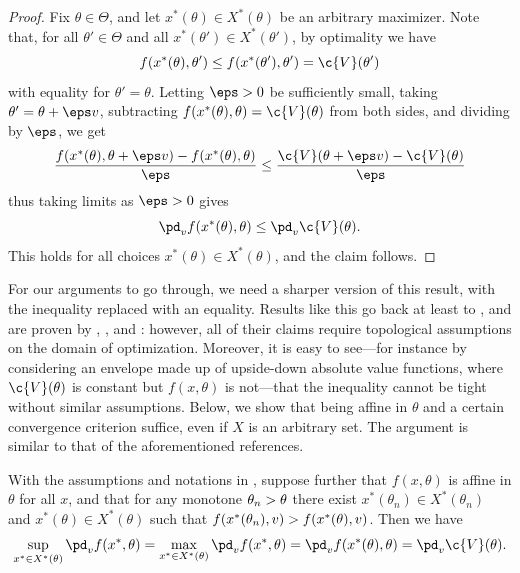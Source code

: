 \documentclass{article}
\begin{document}
\begin{proof}
Fix $\theta\in\Theta$, and let $x^*(\theta) \in X^*(\theta)$ be an arbitrary maximizer. 
Note that, for all $\theta'\in\Theta$ and all $x^*(\theta')\in X^*(\theta')$, by optimality we have
\[
f(x^*(\theta),\theta') \leq f(x^*(\theta'),\theta') = \c{V}(\theta')
\]
with equality for $\theta' = \theta$.
Letting $\eps>0$ be sufficiently small, taking $\theta' = \theta + \eps v$, subtracting $f(x^*(\theta), \theta) = \c{V}(\theta)$ from both sides, and dividing by $\eps$, we get 
\[
\frac{f(x^*(\theta),\theta + \eps v) - f(x^*(\theta), \theta)}{\eps} \leq \frac{\c{V}(\theta + \eps v) - \c{V}(\theta)}{\eps}
\]
thus taking limits as $\eps\->0$ gives
\[
\pd_v f(x^*(\theta),\theta) \leq \pd_v \c{V}(\theta)
.
\]
This holds for all choices $x^*(\theta)\in X^*(\theta)$, and the claim follows.
\end{proof}

For our arguments to go through, we need a sharper version of this result, with the inequality replaced with an equality.
Results like this go back at least to \textcite{danskin67}, and are proven by \textcite[Proposition 4.12]{bonnans13}, \textcite[Theorem 10.1]{basar08}, and \textcite{bertsekas99}: however, all of their claims require topological assumptions on the domain of optimization.
Moreover, it is easy to see---for instance by considering an envelope made up of upside-down absolute value functions, where $\c{V}(\theta)$ is constant but $f(x,\theta)$ is not---that the inequality cannot be tight without similar assumptions.
Below, we show that being affine in $\theta$ and a certain convergence criterion suffice, even if $X$ is an arbitrary set.
The argument is similar to that of the aforementioned references.

\begin{lemma}
\label{lem:envelope_sharp}
With the assumptions and notations in , suppose further that $f(x,\theta)$ is affine in $\theta$ for all $x$, and that for any monotone $\theta_n\->\theta$ there exist $x^*(\theta_n)\in X^*(\theta_n)$ and $x^*(\theta)\in X^*(\theta)$ such that $f(x^*(\theta_n),v) \-> f(x^*(\theta),v)$.
Then we have
\[
\sup_{x^*\in X^*(\theta)} \pd_v f(x^*, \theta) = \max_{x^*\in X^*(\theta)} \pd_v f(x^*, \theta) = \pd_v f(x^*(\theta),\theta) = \pd_v \c{V}(\theta)
.
\]
\end{lemma}
\end{document}
